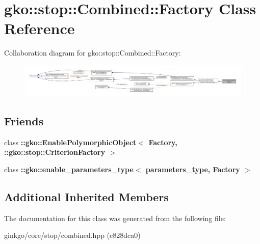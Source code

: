 \hypertarget{classgko_1_1stop_1_1Combined_1_1Factory}{}\section{gko\+:\+:stop\+:\+:Combined\+:\+:Factory Class Reference}
\label{classgko_1_1stop_1_1Combined_1_1Factory}


Collaboration diagram for gko\+:\+:stop\+:\+:Combined\+:\+:Factory\+:
\nopagebreak
\begin{figure}[H]
\begin{center}
\leavevmode
\includegraphics[width=350pt]{classgko_1_1stop_1_1Combined_1_1Factory__coll__graph}
\end{center}
\end{figure}
\subsection*{Friends}
\begin{DoxyCompactItemize}
\item 
\mbox{\label{classgko_1_1stop_1_1Combined_1_1Factory_aaa5507cf00e5361a77971746fefa42e6}} 
class {\bfseries \+::gko\+::\+Enable\+Polymorphic\+Object$<$ Factory, \+::gko\+::stop\+::\+Criterion\+Factory $>$}
\item 
\mbox{\label{classgko_1_1stop_1_1Combined_1_1Factory_a0d176cbd42d6214e11aee8c30ca256fc}} 
class {\bfseries \+::gko\+::enable\+\_\+parameters\+\_\+type$<$ parameters\+\_\+type, Factory $>$}
\end{DoxyCompactItemize}
\subsection*{Additional Inherited Members}


The documentation for this class was generated from the following file\+:\begin{DoxyCompactItemize}
\item 
ginkgo/core/stop/combined.\+hpp (c828dca0)\end{DoxyCompactItemize}

